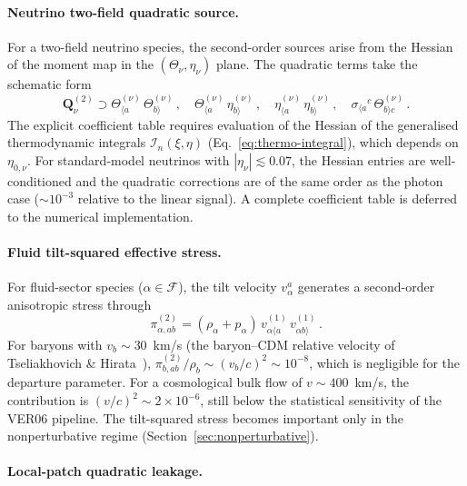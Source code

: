 \paragraph{Neutrino two-field quadratic source.}

For a two-field neutrino species, the second-order
sources arise from the Hessian of the moment map in the
$(\Theta_\nu, \eta_\nu)$ plane.  The quadratic terms
take the schematic form
\begin{equation}\label{eq:nu-quadratic}
\mathbf{Q}_\nu^{(2)}
\supset
\Theta^{(\nu)}_{\langle a}\,
\Theta^{(\nu)}_{b\rangle}\,,
\quad
\Theta^{(\nu)}_{\langle a}\,
\eta^{(\nu)}_{b\rangle}\,,
\quad
\eta^{(\nu)}_{\langle a}\,
\eta^{(\nu)}_{b\rangle}\,,
\quad
\sigma_{\langle a}{}^c\,
\Theta^{(\nu)}_{b\rangle c}\,.
\end{equation}
The explicit coefficient table requires evaluation of
the Hessian of the generalised thermodynamic integrals
$\mathcal{I}_n(\xi, \eta)$
(Eq.~\ref{eq:thermo-integral}), which depends on
$\eta_{0,\nu}$.  For standard-model neutrinos with
$|\eta_\nu| \lesssim 0.07$, the Hessian entries are
well-conditioned and the quadratic corrections are of
the same order as the photon case ($\sim 10^{-3}$
relative to the linear signal).  A complete coefficient
table is deferred to the numerical implementation.


\paragraph{Fluid tilt-squared effective stress.}

For fluid-sector species ($\alpha \in \mathcal{F}$),
the tilt velocity $v_\alpha^a$ generates a
second-order anisotropic stress through
\begin{equation}\label{eq:tilt-squared}
\pi_{\alpha,ab}^{(2)}
= (\rho_\alpha + p_\alpha)\,
  v_{\alpha\langle a}^{(1)}\,
  v_{\alpha b\rangle}^{(1)}\,.
\end{equation}
For baryons with $v_b \sim 30$~km/s (the baryon--CDM
relative velocity of
Tseliakhovich \& Hirata~\cite{TseliakhovichHirata2010}),
$\pi_{b,ab}^{(2)} / \rho_b \sim (v_b/c)^2
\sim 10^{-8}$, which is negligible for the departure
parameter.  For a cosmological bulk flow of
$v \sim 400$~km/s, the contribution is
$(v/c)^2 \sim 2 \times 10^{-6}$, still below the
statistical sensitivity of the VER06 pipeline.  The
tilt-squared stress becomes important only in the
nonperturbative regime
(Section~\ref{sec:nonperturbative}).


\paragraph{Local-patch quadratic leakage.}

